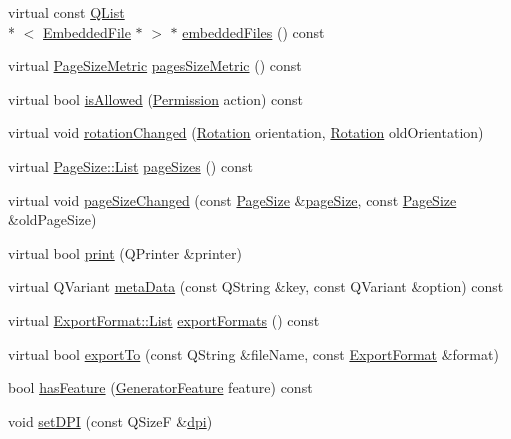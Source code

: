 \begin{DoxyCompactItemize}
\item 
virtual const \hyperlink{classQList}{Q\+List}\\*
$<$ \hyperlink{classOkular_1_1EmbeddedFile}{Embedded\+File} $\ast$ $>$ $\ast$ \hyperlink{classOkular_1_1Generator_a1573d9a398806b5b36e7b4b4b175c726}{embedded\+Files} () const 
\item 
virtual \hyperlink{classOkular_1_1Generator_aa09b8aeb5398ea5f07644f35bd5934f3}{Page\+Size\+Metric} \hyperlink{classOkular_1_1Generator_add5b37f6ed7b6ce0b3bc72f72d26ec26}{pages\+Size\+Metric} () const 
\item 
virtual bool \hyperlink{classOkular_1_1Generator_a19c839d0ce232775f4fe51af85e822b1}{is\+Allowed} (\hyperlink{namespaceOkular_a3601f4e702453ddf1125476dd6e7577b}{Permission} action) const 
\item 
virtual void \hyperlink{classOkular_1_1Generator_a46e155b74cccf91f48ad58eafcc7a716}{rotation\+Changed} (\hyperlink{namespaceOkular_a8556d00465f61ef533c6b027669e7da6}{Rotation} orientation, \hyperlink{namespaceOkular_a8556d00465f61ef533c6b027669e7da6}{Rotation} old\+Orientation)
\item 
virtual \hyperlink{classOkular_1_1PageSize_a6c450ee7c579f47402a21588403ea0ab}{Page\+Size\+::\+List} \hyperlink{classOkular_1_1Generator_a5693e2448611c1cc68015ec26fb3cd5d}{page\+Sizes} () const 
\item 
virtual void \hyperlink{classOkular_1_1Generator_a0a2b9220edaee0423be1747c830409ca}{page\+Size\+Changed} (const \hyperlink{classOkular_1_1PageSize}{Page\+Size} \&\hyperlink{classpageSize}{page\+Size}, const \hyperlink{classOkular_1_1PageSize}{Page\+Size} \&old\+Page\+Size)
\item 
virtual bool \hyperlink{classOkular_1_1Generator_aa786d406a1b0db6679a3bc62bbe2dc82}{print} (Q\+Printer \&printer)
\item 
virtual Q\+Variant \hyperlink{classOkular_1_1Generator_a74f6b91e31ead5b572ffb9fb6b06c188}{meta\+Data} (const Q\+String \&key, const Q\+Variant \&option) const 
\item 
virtual \hyperlink{classOkular_1_1ExportFormat_a987d72c1a1456b8a983a37603a8fa78d}{Export\+Format\+::\+List} \hyperlink{classOkular_1_1Generator_a74280fb193319daab955feac694123ac}{export\+Formats} () const 
\item 
virtual bool \hyperlink{classOkular_1_1Generator_a9e78f37aafbfdaf04f76f4163c27aa5e}{export\+To} (const Q\+String \&file\+Name, const \hyperlink{classOkular_1_1ExportFormat}{Export\+Format} \&format)
\item 
bool \hyperlink{classOkular_1_1Generator_aacad530ef4f0c31a4addc89eb85ec8da}{has\+Feature} (\hyperlink{classOkular_1_1Generator_a8517096896273a5ba5b970be09313c77}{Generator\+Feature} feature) const 
\item 
void \hyperlink{classOkular_1_1Generator_af7d384aa3ef522873900c5169896b517}{set\+D\+P\+I} (const Q\+Size\+F \&\hyperlink{classOkular_1_1Generator_ad3dd14822e3f5c9d1785008a207f34fb}{dpi})
\end{DoxyCompactItemize}
